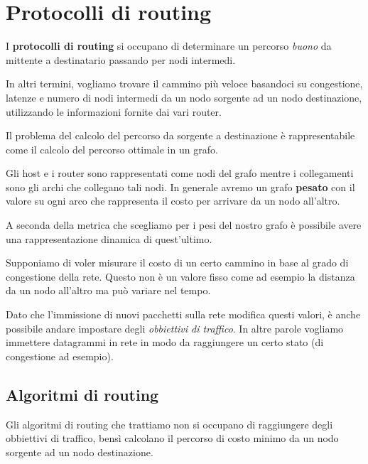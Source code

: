 \section{Protocolli di routing}
I \textbf{protocolli di routing} si occupano di determinare un percorso
\emph{buono} da mittente a destinatario passando per nodi intermedi.

In altri termini, vogliamo trovare il cammino più veloce basandoci
su congestione, latenze e numero di nodi intermedi da un nodo sorgente 
ad un nodo destinazione, utilizzando le informazioni fornite dai vari
router.

Il problema del calcolo del percorso da sorgente a destinazione è 
rappresentabile come il calcolo del percorso ottimale in un grafo.

Gli host e i router sono rappresentati come nodi del grafo mentre i
collegamenti sono gli archi che collegano tali nodi. In generale avremo
un grafo \textbf{pesato} con il valore su ogni arco che rappresenta il 
costo per arrivare da un nodo all'altro.

A seconda della metrica che scegliamo per i pesi del nostro grafo è
possibile avere una rappresentazione dinamica di quest'ultimo. 

Supponiamo di voler misurare il costo di un certo cammino in base al 
grado di congestione della rete. Questo non è un valore fisso come ad
esempio la distanza da un nodo all'altro ma può variare nel tempo.

Dato che l'immissione di nuovi pacchetti sulla rete modifica questi 
valori, è anche possibile andare impostare degli \emph{obbiettivi di 
traffico}. In altre parole vogliamo immettere datagrammi in rete in 
modo da raggiungere un certo stato (di congestione ad esempio).

\subsection{Algoritmi di routing}
Gli algoritmi di routing che trattiamo non si occupano di raggiungere
degli obbiettivi di traffico, bensì calcolano il percorso di costo 
minimo da un nodo sorgente ad un nodo destinazione.

